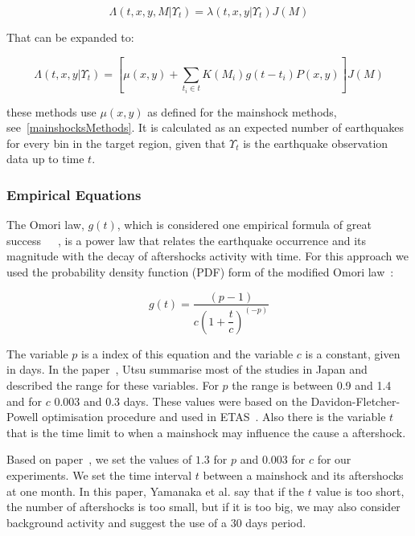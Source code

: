 \begin{equation}\label{reducedgamodel}
	\Lambda(t,x,y,M|\Upsilon_t) = \lambda(t,x,y|\Upsilon_t)J(M)
\end{equation}

That can be expanded to:

\begin{equation}\label{emp-model}
 \Lambda(t,x,y|\Upsilon_t) = [\mu(x,y) + \displaystyle\sum_{t_i \in t} K(M_i)g(t-t_i)P(x,y)]J(M)
\end{equation}

 these methods use $\mu(x,y)$ as defined for the mainshock methods, see~\ref{mainshocksMethods}. It is calculated as an expected number of earthquakes for every bin in the target region, given that $\Upsilon_t$ is the earthquake observation data up to time $t$.

\subsubsection{Empirical Equations}

The Omori law, $g(t)$, which is considered one empirical formula of great success~\cite{zhuang2004analyzing}~\cite{utsu1995centenary}~\cite{omori1895after}, is a power law that relates the earthquake occurrence and its magnitude with the decay of aftershocks activity with time. For this approach we used the probability density function (PDF) form of the modified Omori law~\cite{zhuang2004analyzing}:

\begin{equation}\label{omori}
	g(t)= \dfrac{(p-1)}{c(1+ \dfrac{t}{c})^(-p)}
\end{equation}

The variable $p$ is a index of this equation and the variable $c$ is a constant, given in days. In the paper~\cite{utsu1995centenary}, Utsu summarise most of the studies in Japan and described the range for these variables. For $p$ the range is between 0.9 and 1.4 and for $c$ 0.003 and 0.3 days. These values were based on the Davidon-Fletcher-Powell optimisation procedure and used in ETAS~\cite{utsu1995centenary}. Also there is the variable $t$ that is the time limit to when a mainshock may influence the cause a aftershock.

Based on paper~\cite{yamanaka1990scaling}, we set the values of $1.3$ for $p$ and $0.003$ for $c$ for our experiments. We set the time interval $t$ between a mainshock and its aftershocks at one month. In this paper, Yamanaka et al. say that if the $t$ value is too short, the number of aftershocks is too small, but if it is too big, we may also consider background activity and suggest the use of a 30 days period.

